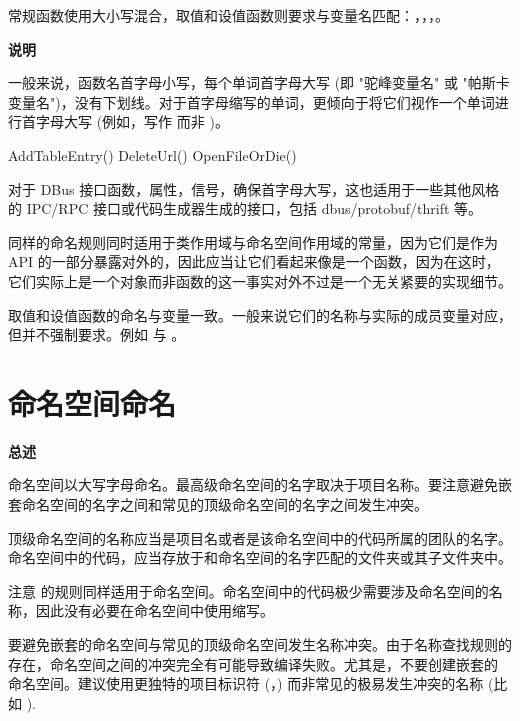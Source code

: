 常规函数使用大小写混合，取值和设值函数则要求与变量名匹配：，，，。

\textbf{说明}

一般来说，函数名首字母小写，每个单词首字母大写 (即 "驼峰变量名" 或 "帕斯卡变量名")，没有下划线。对于首字母缩写的单词，更倾向于将它们视作一个单词进行首字母大写 (例如，写作  而非 )。

\begin{cppcode}
  AddTableEntry()
  DeleteUrl()
  OpenFileOrDie()
\end{cppcode}

\begin{DWarn}
  对于 DBus 接口函数，属性，信号，确保首字母大写，这也适用于一些其他风格的 IPC/RPC 接口或代码生成器生成的接口，包括 dbus/protobuf/thrift 等。
\end{DWarn}

同样的命名规则同时适用于类作用域与命名空间作用域的常量，因为它们是作为 API 的一部分暴露对外的，因此应当让它们看起来像是一个函数，因为在这时，它们实际上是一个对象而非函数的这一事实对外不过是一个无关紧要的实现细节。

取值和设值函数的命名与变量一致。一般来说它们的名称与实际的成员变量对应，但并不强制要求。例如  与 。

\section{命名空间命名}

\textbf{总述}
\begin{DWarn}
  命名空间以大写字母命名。最高级命名空间的名字取决于项目名称。要注意避免嵌套命名空间的名字之间和常见的顶级命名空间的名字之间发生冲突。
\end{DWarn}

顶级命名空间的名称应当是项目名或者是该命名空间中的代码所属的团队的名字。命名空间中的代码，应当存放于和命名空间的名字匹配的文件夹或其子文件夹中。

注意  的规则同样适用于命名空间。命名空间中的代码极少需要涉及命名空间的名称，因此没有必要在命名空间中使用缩写。

要避免嵌套的命名空间与常见的顶级命名空间发生名称冲突。由于名称查找规则的存在，命名空间之间的冲突完全有可能导致编译失败。尤其是，不要创建嵌套的  命名空间。建议使用更独特的项目标识符 (，) 而非常见的极易发生冲突的名称 (比如 ).

